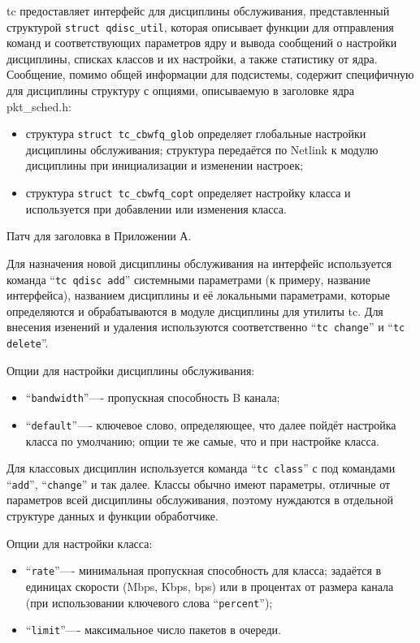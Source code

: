 	{tc} предоставляет интерфейс для дисциплины обслуживания,
	представленный структурой \lstinline{struct qdisc_util}, которая
	описывает функции для отправления команд и соответствующих параметров ядру
	и вывода сообщений о настройки дисциплины, списках классов и их настройки, а
	также статистику от ядра. Сообщение, помимо общей информации для подсистемы,
	содержит специфичную для дисциплины структуру с опциями, описываемую
	в заголовке ядра {pkt\_sched.h}:
	\begin{itemize}
		\item структура \lstinline{struct tc_cbwfq_glob} определяет глобальные настройки
			  дисциплины обслуживания; структура передаётся по Netlink к модулю дисциплины
			  при инициализации и изменении настроек;
		\item структура \lstinline{struct tc_cbwfq_copt} определяет настройку
			  класса и используется при добавлении или изменения класса.
	\end{itemize}

	Патч для заголовка в Приложении А.

	Для назначения новой дисциплины обслуживания на интерфейс используется
	команда ``\lstinline{tc qdisc add}''  системными параметрами (к примеру, название
	интерфейса), названием дисциплины и её локальными параметрами, которые
	определяются и обрабатываются в модуле дисциплины для утилиты {tc}. 
	Для внесения изенений и удаления используются соответственно ``\lstinline{tc change}''
	и  ``\lstinline{tc delete}''.

	Опции для настройки дисциплины обслуживания:
	\begin{itemize}
		\item ``\lstinline{bandwidth}''---- пропускная способность B канала;
		\item ``\lstinline{default}''---- ключевое слово, определяющее, что далее пойдёт
									 настройка класса по умолчанию; опции те же самые, что
									 и при настройке класса.  
	\end{itemize}

	Для классовых дисциплин используется команда  ``\lstinline{tc class}'' с под командами
	 ``\lstinline{add}'',  ``\lstinline{change}'' и так далее. Классы обычно имеют параметры,
	отличные от параметров всей дисциплины обслуживания, поэтому нуждаются в отдельной
	структуре данных и функции обработчике.

	Опции для настройки класса:
	\begin{itemize}
		\item ``\lstinline{rate}''---- минимальная пропускная способность для класса;
											  задаётся в единицах скорости (Mbps, Kbps, bps) или в процентах
											  от размера канала (при использовании ключевого слова  ``\lstinline{percent}'');
		\item ``\lstinline{limit}''---- максимальное число пакетов в очереди.
	\end{itemize}

